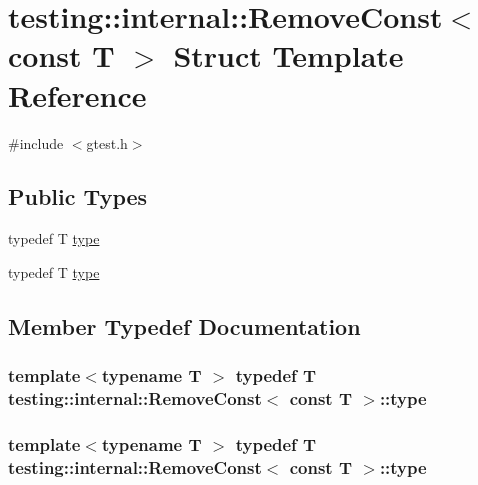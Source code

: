 \hypertarget{structtesting_1_1internal_1_1_remove_const_3_01const_01_t_01_4}{\section{testing\-:\-:internal\-:\-:Remove\-Const$<$ const T $>$ Struct Template Reference}
\label{structtesting_1_1internal_1_1_remove_const_3_01const_01_t_01_4}
}


{\ttfamily \#include $<$gtest.\-h$>$}

\subsection*{Public Types}
\begin{DoxyCompactItemize}
\item 
typedef T \hyperlink{structtesting_1_1internal_1_1_remove_const_3_01const_01_t_01_4_ac88c6824d228ab05091e5a4f1c1a95fc}{type}
\item 
typedef T \hyperlink{structtesting_1_1internal_1_1_remove_const_3_01const_01_t_01_4_ac88c6824d228ab05091e5a4f1c1a95fc}{type}
\end{DoxyCompactItemize}


\subsection{Member Typedef Documentation}
\hypertarget{structtesting_1_1internal_1_1_remove_const_3_01const_01_t_01_4_ac88c6824d228ab05091e5a4f1c1a95fc}{
\subsubsection[{type}]{\setlength{\rightskip}{0pt plus 5cm}template$<$typename T $>$ typedef T {\bf testing\-::internal\-::\-Remove\-Const}$<$ const T $>$\-::{\bf type}}}\label{structtesting_1_1internal_1_1_remove_const_3_01const_01_t_01_4_ac88c6824d228ab05091e5a4f1c1a95fc}
\hypertarget{structtesting_1_1internal_1_1_remove_const_3_01const_01_t_01_4_ac88c6824d228ab05091e5a4f1c1a95fc}{
\subsubsection[{type}]{\setlength{\rightskip}{0pt plus 5cm}template$<$typename T $>$ typedef T {\bf testing\-::internal\-::\-Remove\-Const}$<$ const T $>$\-::{\bf type}}}\label{structtesting_1_1internal_1_1_remove_const_3_01const_01_t_01_4_ac88c6824d228ab05091e5a4f1c1a95fc}


